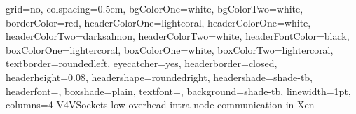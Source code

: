 \documentclass[a0paper,portrait,final]{baposter}
\begin{document}
\newlength{\leftimgwidth}
\begin{poster}%
  {
  grid=no,
  colspacing=0.5em,
  bgColorOne=white,
  bgColorTwo=white,
  borderColor=red,
  headerColorOne=lightcoral,
  headerColorOne=white,
  headerColorTwo=darksalmon,
  headerColorTwo=white,
  headerFontColor=black,
  boxColorOne=lightercoral,
  boxColorOne=white,
  boxColorTwo=lightercoral,
  textborder=roundedleft,
  eyecatcher=yes,
  headerborder=closed,
  headerheight=0.08\textheight,
  headershape=roundedright,
  headershade=shade-tb,
  headerfont=\Large\textsf, %
  boxshade=plain,
  textfont={\sf },
  background=shade-tb,
  linewidth=1pt,
  columns=4
  }
  {
   }
  {\sc V4VSockets}
  { \sc\vspace{0.5em} low overhead intra-node communication in Xen}
  {   
   }


\end{poster}
\end{document}
